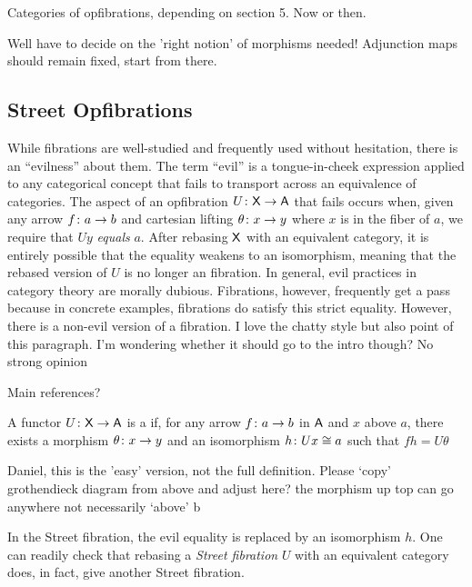 \documentclass{amsart}
\begin{document}
{\chris Categories of opfibrations, depending on section 5. Now or then.}

{\chris Well have to decide on the 'right notion' of morphisms needed! Adjunction maps should remain fixed, start from there.}

\subsection*{Street Opfibrations}

While fibrations are well-studied and frequently used
without hesitation, there is an ``evilness'' about them. The
term ``evil'' is a tongue-in-cheek expression applied to any
categorical concept that fails to transport across an
equivalence of categories.  The aspect of an opfibration
$ U \colon \mathsf{X} \to \mathsf{A} $ that fails occurs when, given any arrow
$ f \colon a \to b $ and cartesian lifting
$ \theta \colon x \to y $ where $ x $ is in the fiber of
$ a $, we require that $ Uy $ \emph{equals} $ a $.  After
rebasing $ \mathsf{X} $ with an equivalent category, it is entirely
possible that the equality weakens to an isomorphism, meaning
that the rebased version of $ U $ is no longer an
fibration. In general, evil practices in category theory are
morally dubious. Fibrations, however, frequently get a pass
because in concrete examples, fibrations do satisfy this
strict equality.  However, there is a non-evil version of a
fibration. {\chris I love the chatty style but also point of this paragraph. I'm wondering whether it should go to the intro though? No strong opinion}

{\chris Main references?}


\begin{defn}
  A functor $ U \colon \mathsf{X} \to \mathsf{A} $ is a  if, for any arrow $ f \colon a \to b $ in $ \mathsf{A}
  $ and $ x $ above $ a $, there exists a
  morphism  $ \theta \colon x \to y $ and an
  isomorphism $ h \colon Ux \cong a $ such that $ fh = U\theta $
  
\end{defn}{\chris Daniel, this is the 'easy' version, not the full definition. Please `copy' grothendieck diagram from above and adjust here? the morphism up top can go anywhere not necessarily `above' b}

In the Street fibration, the evil equality is replaced by an
isomorphism $ h $.  One can readily check that rebasing a
\emph{Street fibration} $ U $ with an equivalent category
does, in fact, give another Street fibration.
\end{document}
